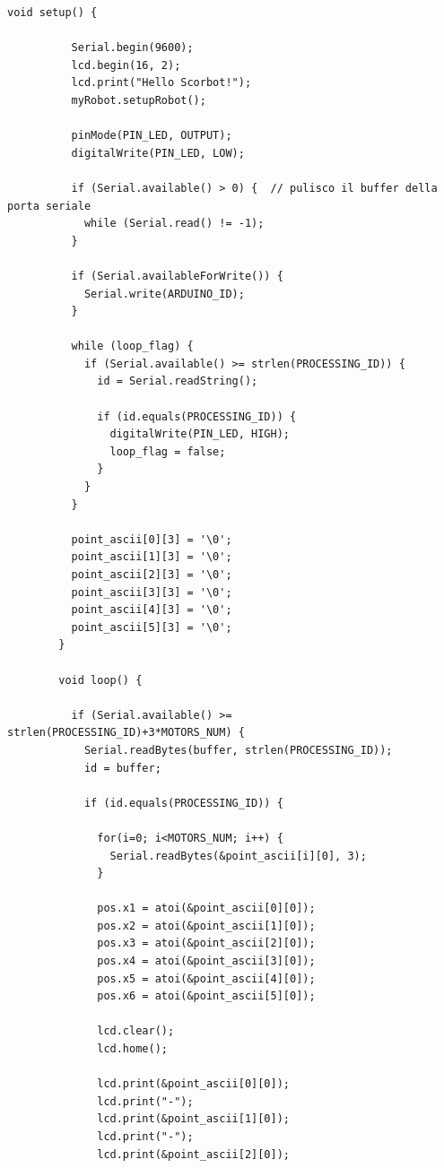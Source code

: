 \documentclass[a4paper]{article}
\begin{document}
    \begin{lstlisting}[style=myarduinostyle, caption=Parti principali del firmware]
        void setup() {
        
          Serial.begin(9600);
          lcd.begin(16, 2);  
          lcd.print("Hello Scorbot!");
          myRobot.setupRobot();
        
          pinMode(PIN_LED, OUTPUT);
          digitalWrite(PIN_LED, LOW);
        
          if (Serial.available() > 0) {  // pulisco il buffer della porta seriale
            while (Serial.read() != -1);
          }
        
          if (Serial.availableForWrite()) {
            Serial.write(ARDUINO_ID);
          }
        
          while (loop_flag) {
            if (Serial.available() >= strlen(PROCESSING_ID)) {
              id = Serial.readString();
        
              if (id.equals(PROCESSING_ID)) {
                digitalWrite(PIN_LED, HIGH);
                loop_flag = false;
              }
            }
          }
        
          point_ascii[0][3] = '\0';
          point_ascii[1][3] = '\0';
          point_ascii[2][3] = '\0';
          point_ascii[3][3] = '\0';
          point_ascii[4][3] = '\0';
          point_ascii[5][3] = '\0';
        }
        
        void loop() {
        
          if (Serial.available() >= strlen(PROCESSING_ID)+3*MOTORS_NUM) {
            Serial.readBytes(buffer, strlen(PROCESSING_ID));
            id = buffer;
            
            if (id.equals(PROCESSING_ID)) {
            
              for(i=0; i<MOTORS_NUM; i++) {
                Serial.readBytes(&point_ascii[i][0], 3);
              }
              
              pos.x1 = atoi(&point_ascii[0][0]);
              pos.x2 = atoi(&point_ascii[1][0]);
              pos.x3 = atoi(&point_ascii[2][0]);
              pos.x4 = atoi(&point_ascii[3][0]);
              pos.x5 = atoi(&point_ascii[4][0]);
              pos.x6 = atoi(&point_ascii[5][0]);
        
              lcd.clear();
              lcd.home();
        
              lcd.print(&point_ascii[0][0]);
              lcd.print("-");
              lcd.print(&point_ascii[1][0]);
              lcd.print("-");
              lcd.print(&point_ascii[2][0]);
        

\end{lstlisting}
\end{document}
